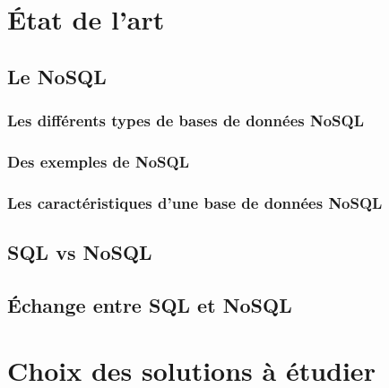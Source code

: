       \chapter{État de l'art}
      

                \section{Le \textsf{NoSQL}}
                

                        \subsection{Les différents types de bases de données \textsf{NoSQL}}\label{categorie} 
                         

                        \subsection{Des exemples de \textsf{NoSQL}}
                        

                        \subsection{Les caractéristiques d'une base de données \textsf{NoSQL}}\label{carac}
                        
                \newpage
                \section{\textsf{SQL} vs \textsf{NoSQL}}
                
                \newpage
                \section{Échange entre \textsf{SQL} et \textsf{NoSQL}}
                
                \newpage

      \chapter{Choix des solutions à étudier}
      
     

